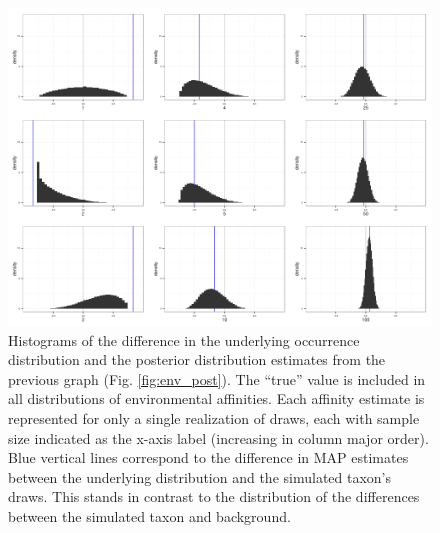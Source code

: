 \documentclass[12pt,letterpaper]{article}
\begin{document}
\begin{figure}[ht]
  \centering
  \includegraphics[height = \textheight,width=\textwidth,keepaspectratio=true]{figure/env_diff}
  \caption{Histograms of the difference in the underlying occurrence distribution and the posterior distribution estimates from the previous graph (Fig. \ref{fig:env_post}). The ``true'' value is included in all distributions of environmental affinities. Each affinity estimate is represented for only a single realization of draws, each with sample size indicated as the x-axis label (increasing in column major order). Blue vertical lines correspond to the difference in MAP estimates between the underlying distribution and the simulated taxon's draws. This stands in contrast to the distribution of the differences between the simulated taxon and background.}
  \label{fig:env_diff}
\end{figure}
\end{document}
